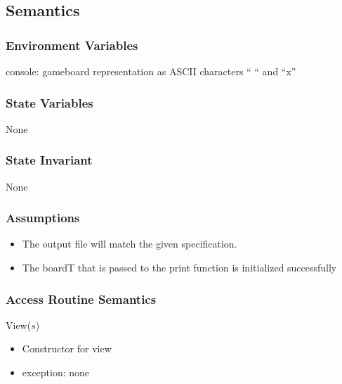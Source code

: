 \documentclass[12pt]{article}
\begin{document}
\subsection* {Semantics}

\subsubsection* {Environment Variables}
console: gameboard representation as ASCII characters `` `` and ``x''

\subsubsection* {State Variables}

None

\subsubsection* {State Invariant}

None

\subsubsection* {Assumptions}

\begin{itemize}

\item The output file will match the given specification.

\item The boardT that is passed to the print function is initialized successfully


\end{itemize}



\subsubsection* {Access Routine Semantics}

\noindent View($s$)
\begin{itemize}
\item Constructor for view

\item exception: none
\end{itemize}
\end{document}
